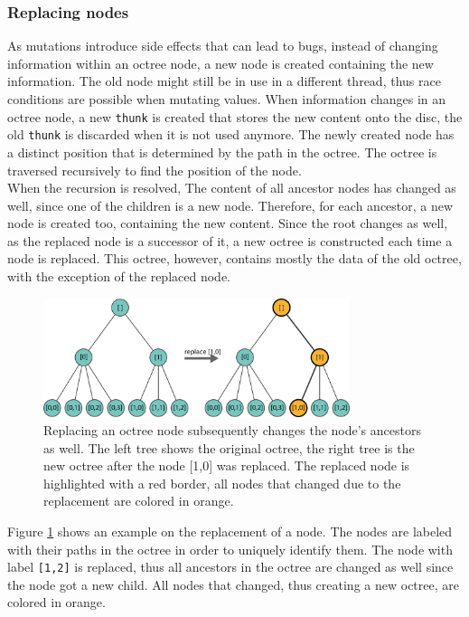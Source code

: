 \subsubsection{Replacing nodes}

As mutations introduce side effects that can lead to bugs, instead of changing information within an octree node, a new node is created containing the new information. The old node might still be in use in a different thread, thus race conditions are possible when mutating values. When information changes in an octree node, a new \verb|thunk| is created that stores the new content onto the disc, the old \verb|thunk| is discarded when it is not used anymore. The newly created node has a distinct position that is determined by the path in the octree. The octree is traversed recursively to find the position of the node. 
\\
When the recursion is resolved, The content of all ancestor nodes has changed as well, since one of the children is a new node. Therefore, for each ancestor, a new node is created too, containing the new content. Since the root changes as well, as the replaced node is a successor of it, a new octree is constructed each time a node is replaced. This octree, however, contains mostly the data of the old octree, with the exception of the replaced node. 

\begin{figure}[h]
    \centering
    \includegraphics[width=0.8\textwidth]{Implementation/octreeReplace.png}
    \caption{Replacing an octree node subsequently changes the node's ancestors as well. The left tree shows the original octree, the right tree is the new octree after the node [1,0] was replaced. The replaced node is highlighted with a red border, all nodes that changed due to the replacement are colored in orange. }
    \label{fig:octreeReplace}
\end{figure}

Figure \ref{fig:octreeReplace} shows an example on the replacement of a node. The nodes are labeled with their paths in the octree in order to uniquely identify them. The node with label \verb|[1,2]| is replaced, thus all ancestors in the octree are changed as well since the node got a new child. All nodes that changed, thus creating a new octree, are colored in orange. 


